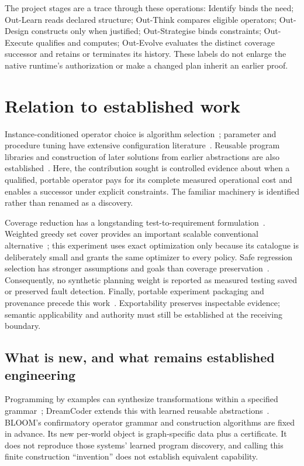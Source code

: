 \documentclass[11pt,letterpaper]{article}
\begin{document}
The project stages are a trace through these operations: Identify binds the need; Out-Learn reads declared structure; Out-Think compares eligible operators; Out-Design constructs only when justified; Out-Strategise binds constraints; Out-Execute qualifies and computes; Out-Evolve evaluates the distinct coverage successor and retains or terminates its history. These labels do not enlarge the native runtime's authorization or make a changed plan inherit an earlier proof.

\section{Relation to established work}
\label{sec:bloom-related}

Instance-conditioned operator choice is algorithm selection~\cite{rice1976selection}; parameter and procedure tuning have extensive configuration literature~\cite{hutter2011smac}. Reusable program libraries and construction of later solutions from earlier abstractions are also established~\cite{ellis2021dreamcoder}. Here, the contribution sought is controlled evidence about when a qualified, portable operator pays for its complete measured operational cost and enables a successor under explicit constraints. The familiar machinery is identified rather than renamed as a discovery.

Coverage reduction has a longstanding test-to-requirement formulation~\cite{harrold1993reduction}. Weighted greedy set cover provides an important scalable conventional alternative~\cite{chvatal1979cover}; this experiment uses exact optimization only because its catalogue is deliberately small and grants the same optimizer to every policy. Safe regression selection has stronger assumptions and goals than coverage preservation~\cite{rothermel1997safe}. Consequently, no synthetic planning weight is reported as measured testing saved or preserved fault detection. Finally, portable experiment packaging and provenance precede this work~\cite{chirigati2013reprozip}. Exportability preserves inspectable evidence; semantic applicability and authority must still be established at the receiving boundary.

\subsection{What is new, and what remains established engineering}
Programming by examples can synthesize transformations within a specified grammar~\cite{gulwani2011strings}; DreamCoder extends this with learned reusable abstractions~\cite{ellis2021dreamcoder}. BLOOM's confirmatory operator grammar and construction algorithms are fixed in advance. Its new per-world object is graph-specific data plus a certificate. It does not reproduce those systems' learned program discovery, and calling this finite construction ``invention'' does not establish equivalent capability.
\end{document}
